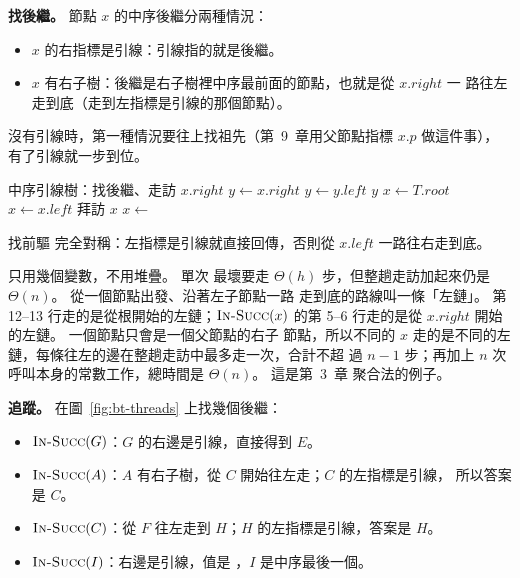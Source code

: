 \textbf{找後繼。} 節點 $x$ 的中序後繼分兩種情況：
\begin{itemize}
\item $x$ 的右指標是引線：引線指的就是後繼。
\item $x$ 有右子樹：後繼是右子樹裡中序最前面的節點，也就是從 $x.\mathit{right}$ 一
路往左走到底（走到左指標是引線的那個節點）。
\end{itemize}
沒有引線時，第一種情況要往上找祖先（第~9~章用父節點指標 $x.p$ 做這件事），
有了引線就一步到位。

\begin{pseudo}[label=alg:bt-insucc]{中序引線樹：找後繼、走訪}
        \State \Return $x.\mathit{right}$
    \EndIf
    \State $y \gets x.\mathit{right}$
     
        \State $y \gets y.\mathit{left}$
    \EndWhile
    \State \Return $y$
\EndFunction
\Statex
{}
    \State $x \gets T.\mathit{root}$
        \State \Return
    \EndIf
     
        \State $x \gets x.\mathit{left}$
    \EndWhile
        \State 拜訪 $x$
        \State $x \gets$ 
    \EndWhile
\EndProcedure
\end{pseudo}

找前驅  完全對稱：左指標是引線就直接回傳，否則從
$x.\mathit{left}$ 一路往右走到底。

 只用幾個變數，不用堆疊。 單次  最壞要走
$\Theta(h)$ 步，但整趟走訪加起來仍是 $\Theta(n)$。 從一個節點出發、沿著左子節點一路
走到底的路線叫一條「左鏈」。 第 12--13 行走的是從根開始的左鏈；$\proc{In-Succ}(x)$
的第 5--6 行走的是從 $x.\mathit{right}$ 開始的左鏈。 一個節點只會是一個父節點的右子
節點，所以不同的 $x$ 走的是不同的左鏈，每條往左的邊在整趟走訪中最多走一次，合計不超
過 $n - 1$ 步；再加上 $n$ 次呼叫本身的常數工作，總時間是 $\Theta(n)$。 這是第~3~章
聚合法的例子。

\textbf{追蹤。} 在圖~\ref{fig:bt-threads} 上找幾個後繼：
\begin{itemize}
\item $\proc{In-Succ}(G)$：$G$ 的右邊是引線，直接得到 $E$。
\item $\proc{In-Succ}(A)$：$A$ 有右子樹，從 $C$ 開始往左走；$C$ 的左指標是引線，
所以答案是 $C$。
\item $\proc{In-Succ}(C)$：從 $F$ 往左走到 $H$；$H$ 的左指標是引線，答案是 $H$。
\item $\proc{In-Succ}(I)$：右邊是引線，值是 \NIL，$I$ 是中序最後一個。
\end{itemize}

